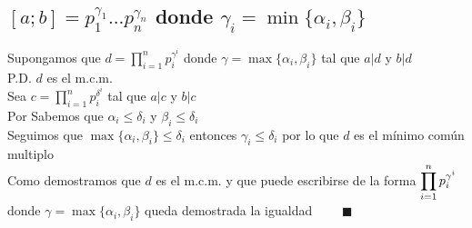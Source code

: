     \subsection{$[a;b]= p_1^{\gamma_1}...p_n^{\gamma_n}$ donde $\gamma_i = \min\{\alpha_i,\beta_i\}$}
        Supongamos que $d = \displaystyle \prod_{i=1}^{n} p_i^{\gamma^i}$ donde $\gamma = \max\{\alpha_i,\beta_i\}$  tal que $a|d$ y $b|d$ \\
        P.D. $d$  es el m.c.m. \\
        Sea $c = \displaystyle \prod_{i=1}^{n} p_i^{\delta^i}$ tal que $a|c$ y $b|c$ \\
        Por \MakeUppercase{} Sabemos que $\alpha_i\leq\delta_i$ y $\beta_i\leq\delta_i$ \\
        Seguimos que $\max\{\alpha_i,\beta_i\} \leq \delta_i$ entonces $\gamma_i \leq \delta_i$ por lo que $d$ es el mínimo común multiplo \\
        Como demostramos que $d$ es el m.c.m. y que puede escribirse de la forma $\displaystyle \displaystyle \prod_{i=1}^{n} p_i^{\gamma^i}$ donde $\gamma = \max\{\alpha_i,\beta_i\}$ queda demostrada la igualdad $\qquad \blacksquare$